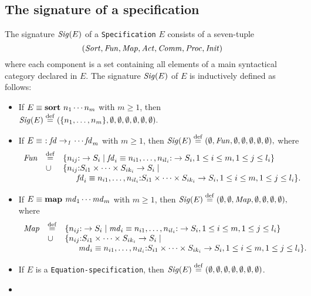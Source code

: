 \documentclass[fleqn,a4paper,dvips]{article}
\newcommand{\Sig}{\nm{Sig}}
\newcommand{\Fun}{\nm{Fun}}
\newcommand{\wor}{\stackrel{\mathrm{def}}{=}}
\begin{document}
{\subsection{The signature of a specification}
\begin{defn}
  The signature $\Sig(E)$ of a {\tt Specification} $E$ consists of a
  seven-tuple \[(\Sort,\Fun,\Map,\Act,\Comm,\Proc,\Init)\] where
  each component is a set containing all elements of a main syntactical category
  declared in $E$.
  The signature $\Sig(E)$ of $E$ is inductively defined as follows:
  \newcommand{\fd}{{\it fd}}
  \newcommand{\md}{{\it md}}
  \newcommand{\pe}{{\it pe}}
  \newcommand{\ad}{{\it ad}}
  \begin{itemize}
  \item
    If $E\equiv \mathbf{sort}~n_1\cdots n_m$ with $m\geq 1$,
    then
    $\Sig(E)\wor(\{n_1,\ldots,n_m\},\emptyset,\emptyset,\emptyset,
    \emptyset,\emptyset,\emptyset).$
\item
If $E\equiv
\func~\fd_1\cdots \fd_m$ with $m\geq 1$,
then
$\Sig(E)\wor(\emptyset,\Fun,
\emptyset,\emptyset,
\emptyset,\emptyset,\emptyset),$
where \[\begin{array}{lll}
\Fun &\wor&
\{n_{ij}\ap \rightarrow S_i\mid \fd_i\equiv
n_{i1},\ldots,n_{il_i}\ap \rightarrow S_i, 1\leq i\leq m, 1\leq j\leq
l_i\}\\
&\cup&\{n_{ij}\ap S_{i1}\times\cdots\times S_{ik_i}\rightarrow S_i\mid\\
&&~~~~~\fd_i\equiv
n_{i1},\ldots,n_{il_i}\ap S_{i1}\times\cdots\times S_{ik_i}\rightarrow
S_i, 1\leq i\leq
m, 1\leq j\leq l_i\}.
\end{array}
\]
\item
If $E\equiv
\mapkw~\md_1\cdots \md_m$ with $m\geq 1$,
then
$\Sig(E)\wor(\emptyset,\emptyset,\Map, \emptyset,\emptyset,
\emptyset,\emptyset),$
where \[\begin{array}{lll}
\Map &\wor&
\{n_{ij}\ap \rightarrow S_i\mid \md_i\equiv
n_{i1},\ldots,n_{il_i}\ap \rightarrow S_i, 1\leq i\leq m, 1\leq j\leq
l_i\}\\
&\cup&\{n_{ij}\ap S_{i1}\times\cdots\times S_{ik_i}\rightarrow S_i\mid\\
&&~~~~~\md_i\equiv
n_{i1},\ldots,n_{il_i}\ap S_{i1}\times\cdots\times S_{ik_i}\rightarrow
S_i, 1\leq i\leq
m, 1\leq j\leq l_i\}.
\end{array}
\]
\item
If $E$ is a {\tt Equation-specification},
then
$\Sig(E)\wor(\emptyset,\emptyset,\emptyset,\emptyset,\emptyset,\emptyset,\emptyset)$.
\item

\end{itemize}
\end{defn}}
\end{document}
